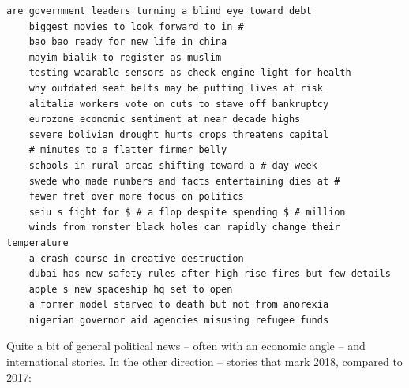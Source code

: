 \documentclass{scrartcl}
\begin{document}
\begin{lstlisting}[basicstyle=\tiny\hlfont]
    are government leaders turning a blind eye toward debt
    biggest movies to look forward to in #
    bao bao ready for new life in china
    mayim bialik to register as muslim
    testing wearable sensors as check engine light for health
    why outdated seat belts may be putting lives at risk
    alitalia workers vote on cuts to stave off bankruptcy
    eurozone economic sentiment at near decade highs
    severe bolivian drought hurts crops threatens capital
    # minutes to a flatter firmer belly
    schools in rural areas shifting toward a # day week
    swede who made numbers and facts entertaining dies at #
    fewer fret over more focus on politics
    seiu s fight for $ # a flop despite spending $ # million
    winds from monster black holes can rapidly change their temperature
    a crash course in creative destruction
    dubai has new safety rules after high rise fires but few details
    apple s new spaceship hq set to open
    a former model starved to death but not from anorexia
    nigerian governor aid agencies misusing refugee funds
\end{lstlisting}

Quite a bit of general political news -- often with an economic angle -- and international stories. In the other direction -- stories that mark 2018, compared to 2017:
\end{document}
